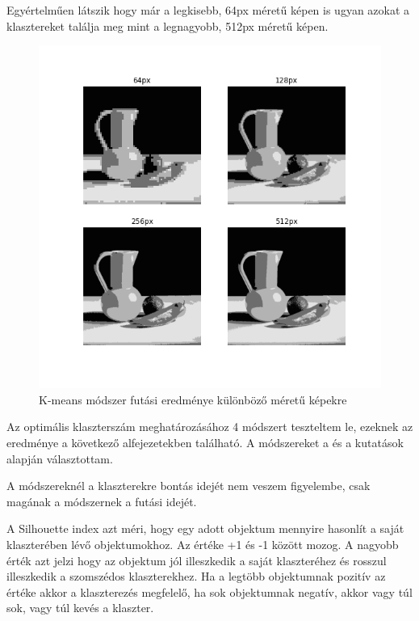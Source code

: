 Egyértelműen látszik hogy már a legkisebb, 64px méretű képen is ugyan azokat a klasztereket találja meg mint a legnagyobb, 512px méretű képen. 

\begin{figure}[h]
\centering
\includegraphics[scale=0.7]{images/kmeans_picture_sizes.png}
\caption{K-means módszer futási eredménye különböző méretű képekre}
\label{fig:kmenas_picture_sizes}
\end{figure}

 \label{optimal_cluster_number}

Az optimális klaszterszám meghatározásához 4 módszert teszteltem le, ezeknek az eredménye a következő alfejezetekben található.
A módszereket a \cite{tomatoleaf} és a \cite{elbow} kutatások alapján választottam.

A módszereknél a klaszterekre bontás idejét nem veszem figyelembe, csak magának a módszernek a futási idejét.


A Silhouette index azt méri, hogy egy adott objektum mennyire hasonlít a saját klaszterében lévő objektumokhoz. Az értéke +1 és -1 között mozog. A nagyobb érték azt jelzi hogy az objektum jól illeszkedik a saját klaszteréhez és rosszul illeszkedik a szomszédos klaszterekhez. Ha a legtöbb objektumnak pozitív az értéke akkor a klaszterezés megfelelő, ha sok objektumnak negatív, akkor vagy túl sok, vagy túl kevés a klaszter.

